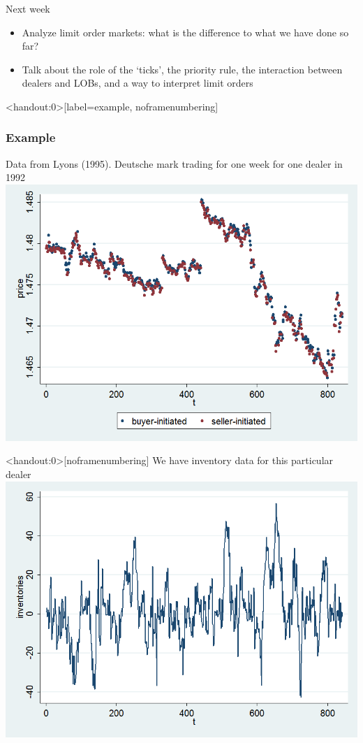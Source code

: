 \documentclass[english,10pt]{beamer}
\begin{document}
\begin{frame}{Next week}
	\begin{itemize}
		\item Analyze limit order markets: what is the difference to what we have done so far?
		\item Talk about the role of the `ticks', the priority rule, the interaction between dealers and LOBs, and a way to interpret limit orders
	\end{itemize}
\end{frame}


\begin{frame}<handout:0>[label=example, noframenumbering]
\frametitle{Example}
Data from Lyons (1995). Deutsche mark trading for one week for one dealer in 1992
\center
\includegraphics[scale=0.3]{pics/trading}
\end{frame}


\begin{frame}<handout:0>[noframenumbering]
We have inventory data for this particular dealer
\center
\includegraphics[scale=0.3]{pics/inventory}
\hyperlink{theory}{}
\end{frame}
\end{document}
